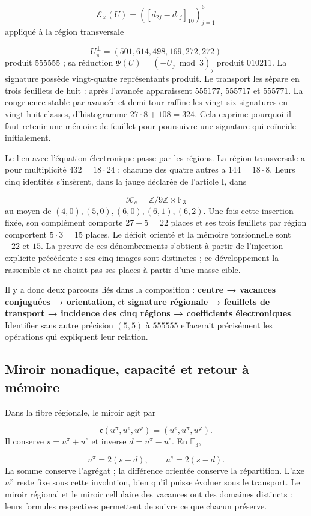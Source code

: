 \[
\mathcal E_\times(U)=([d_{2j}-d_{1j}]_{10})_{j=1}^{6}
\]
appliqué à la région transversale

\[
U_\pi^\perp=(501,614,498,169,272,272)
\]
produit \(555555\) ; sa réduction \(\Psi(U)=(-U_j\bmod3)_j\) produit \(010211\). La signature possède vingt-quatre représentants produit. Le transport les sépare en trois feuillets de huit : après l'avancée apparaissent \(555177\), \(555717\) et \(555771\). La congruence stable par avancée et demi-tour raffine les vingt-six signatures en vingt-huit classes, d'histogramme \(27\cdot8+108=324\). Cela exprime pourquoi il faut retenir une mémoire de feuillet pour poursuivre une signature qui coïncide initialement.



Le lien avec l'équation électronique passe par les régions. La région transversale a pour multiplicité \(432=18\cdot24\) ; chacune des quatre autres a \(144=18\cdot8\). Leurs cinq identités s'insèrent, dans la jauge déclarée de l'article I, dans

\[
\mathcal K_e=\mathbb Z/9\mathbb Z\times\mathbb F_3
\]
au moyen de \((4,0),(5,0),(6,0),(6,1),(6,2)\). Une fois cette insertion fixée, son complément comporte \(27-5=22\) places et ses trois feuillets par région comportent \(5\cdot3=15\) places. Le déficit orienté et la mémoire torsionnelle sont \(-22\) et \(15\). La preuve de ces dénombrements s'obtient à partir de l'injection explicite précédente : ses cinq images sont distinctes ; ce développement la rassemble et ne choisit pas ses places à partir d'une masse cible.

Il y a donc deux parcours liés dans la composition : \textbf{centre → vacances conjuguées → orientation}, et \textbf{signature régionale → feuillets de transport → incidence des cinq régions → coefficients électroniques}. Identifier sans autre précision \((5,5)\) à \(555555\) effacerait précisément les opérations qui expliquent leur relation.

\subsection{Miroir nonadique, capacité et retour à mémoire}
Dans la fibre régionale, le miroir agit par

\[
\mathfrak c(u^\pi,u^e,u^\varphi)=(u^e,u^\pi,u^\varphi).
\]
Il conserve \(s=u^\pi+u^e\) et inverse \(d=u^\pi-u^e\). En \(\mathbb F_3\),

\[
u^\pi=2(s+d),\qquad u^e=2(s-d).
\]
La somme conserve l'agrégat ; la différence orientée conserve la répartition. L'axe \(u^\varphi\) reste fixe sous cette involution, bien qu'il puisse évoluer sous le transport. Le miroir régional et le miroir cellulaire des vacances ont des domaines distincts : leurs formules respectives permettent de suivre ce que chacun préserve.

